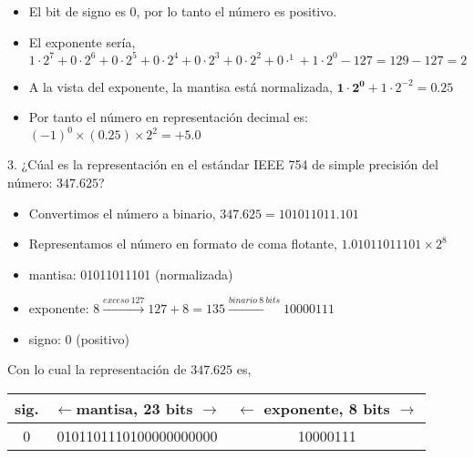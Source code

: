 \begin{paracol}{2}
\begin{itemize}[leftmargin=\dimexpr 26pt-.25in]
\item El bit de signo es 0, por lo tanto el número es positivo.
\item El exponente sería, $1\cdot2^7+0\cdot2^6+0\cdot2^5+0\cdot2^4+0\cdot2^3+0\cdot2^2+0\cdot^1+1\cdot2^0-127=129-127=2$
\item A la vista del exponente, la mantisa está normalizada, $\mathbf{1\cdot 2^0}+1\cdot2^{-2}=0.25$
\item Por tanto el número en representación decimal es: $ (-1)^0\times(0.25)\times2^{2}=+5.0$
\end{itemize}

3. ¿Cúal es la representación en el estándar IEEE 754 de simple precisión del número: $347.625$?
\begin{itemize}[leftmargin=\dimexpr 26pt-.5in]
\item  Convertimos el número a binario, $347.625 = 101011011.101$
\item Representamos el número en formato de coma flotante, $1.01011011101\times 2^{8}$
\item mantisa: 01011011101 (normalizada)
\item exponente: $8 \xrightarrow{exceso\ 127} 127+8=135  \xrightarrow{binario \ 8 \ bits} 10000111$
\item signo: 0 (positivo)
\end{itemize}
Con lo cual la representación de $347.625$ es, 
\end{paracol}
\begin{tabular}{|c||c||c|}
\hline
sig.&$\leftarrow$mantisa, 23 bits $\rightarrow$&$\leftarrow$ exponente, 8 bits $\rightarrow$\\
\hline
0&0101101110100000000000&10000111\\
\hline
\end{tabular}\\
